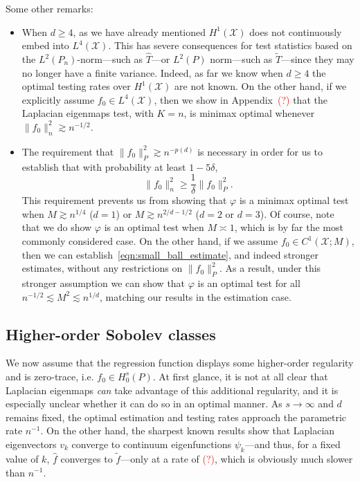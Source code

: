 \documentclass{article}
\newcommand{\1}{\mathbf{1}}
\newcommand{\Leb}{L}
\newcommand{\mc}[1]{\mathcal{#1}}
\newcommand{\wt}[1]{\widetilde{#1}}
\newcommand{\wh}[1]{\widehat{#1}}
\theoremstyle{alden}
\theoremstyle{aldenthm}
\theoremstyle{definition}
\theoremstyle{remark}
\begin{document}
Some other remarks:
\begin{itemize}
	\item When $d \geq 4$, as we have already mentioned $H^1(\mc{X})$ does not continuously embed into $\Leb^4(\mc{X})$. This has severe consequences for test statistics based on the $L^2(P_n)$-norm---such as $\wh{T}$---or $L^2(P)$ norm---such as $\wt{T}$---since they may no longer have a finite variance. Indeed, as far we know when $d \geq 4$ the optimal testing rates over $H^1(\mc{X})$ are not known. On the other hand, if we explicitly assume $f_0 \in \Leb^4(\mc{X})$, then we show in Appendix~\textcolor{red}{(?)} that the Laplacian eigenmaps test, with $K = n$, is minimax optimal whenever $\|f_0\|_n^2 \gtrsim n^{-1/2}$. 
	\item The requirement that $\|f_0\|_P^2 \gtrsim n^{-p(d)}$ is necessary in order for us to establish that with probability at least $1 - 5\delta$,
	\begin{equation}
	\label{eqn:small_ball_estimate}
	\|f_0\|_n^2 \geq \frac{1}{\delta}\|f_0\|_P^2.
	\end{equation}
	This requirement prevents us from showing that $\varphi$ is a minimax optimal test when $M \gtrsim n^{1/4}$ ($d = 1$) or $M \gtrsim n^{2/d - 1/2}$ ($d = 2$ or $d = 3$). Of course, note that we do show $\varphi$ is an optimal test when $M \asymp 1$, which is by far the most commonly considered case. On the other hand, if we assume $f_0 \in C^1(\mc{X};M)$, then we can establish~\eqref{eqn:small_ball_estimate}, and indeed stronger estimates, without any restrictions on $\|f_0\|_P^2$. As a result, under this stronger assumption we can show that $\varphi$ is an optimal test for all $n^{-1/2} \lesssim M^2 \lesssim n^{1/d}$, matching our results in the estimation case.
\end{itemize}

\subsection{Higher-order Sobolev classes}
\label{sec:higher_order_sobolev_classes}
We now assume that the regression function displays some higher-order regularity and is zero-trace, i.e. $f_0 \in H_0^s(P)$. At first glance, it is not at all clear that Laplacian eigenmaps \emph{can} take advantage of this additional regularity, and it is especially unclear whether it can do so in an optimal manner. As $s \to \infty$ and $d$ remains fixed, the optimal estimation and testing rates approach the parametric rate $n^{-1}$. On the other hand, the sharpest known results show that Laplacian eigenvectors $v_k$ converge to continuum eigenfunctions $\psi_k$---and thus, for a fixed value of $k$, $\wh{f}$ converges to $\wt{f}$---only at a rate of \textcolor{red}{(?)}, which is obviously much slower than $n^{-1}$. 
\end{document}
